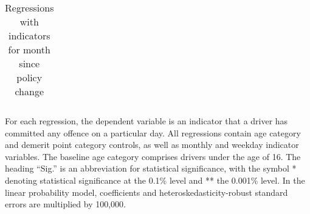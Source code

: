\begin{table}
\begin{tabular}{l r r r r l r r l}
\hline 

\end{tabular} 
\caption{Regressions with indicators for month since policy change} 
For each regression, the dependent variable is an indicator that a driver has committed  
any offence on a particular day.  
All regressions contain age category and demerit point category controls, 
as well as monthly and weekday indicator variables. 
The baseline age category comprises drivers under the age of 16. 
The heading ``Sig.'' is an abbreviation for statistical significance, with 
the symbol * denoting statistical significance at the 0.1\% level 
and ** the 0.001\% level. 
In the linear probability model, coefficients and heteroskedasticity-robust standard errors are  
multiplied by 100,000.  
\label{tab:seas_Logit_vs_LPMx100K_event_month_regs} 
\end{table} 
 
